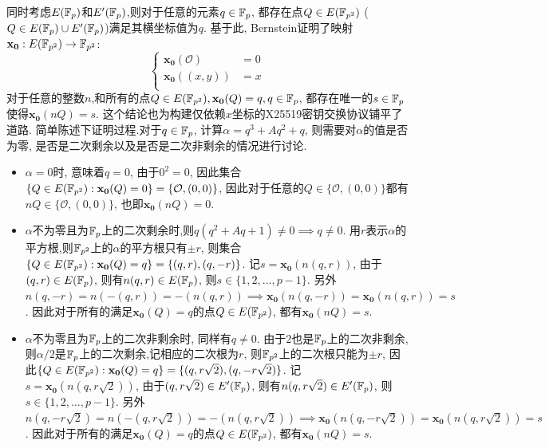 同时考虑$E(\mathbb{F}_p)$和$E'(\mathbb{F}_p)$,则对于任意的元素$q\in\mathbb{F}_p$,
都存在点$Q\in E(\mathbb{F}_{p^2})$ ($Q\in E(\mathbb{F}_p) \cup E'(\mathbb{F}_p)$)满足其横坐标值为$q$.
基于此, Bernstein证明了映射$\mathbf{x_0}: E(\mathbb{F}_{p^2}) \rightarrow \mathbb{F}_{p^2}$:
\begin{equation}\label{eq-mapx0}
\left\{
\begin{array}{rr}
 \mathbf{x_0}(\mathcal{O}) &  = 0 \\
\mathbf{x_0}((x,y)) & =  x \\
\end{array}
\right.
\end{equation}
对于任意的整数$n$,和所有的点$Q\in E(\mathbb{F}_{p^2}), \mathbf{x_0}(Q) = q, q \in \mathbb{F}_p$, 
都存在唯一的$s\in\mathbb{F}_p$使得$\mathbf{x_0}(nQ) = s$. 
这个结论也为构建仅依赖$x$坐标的X25519密钥交换协议铺平了道路.
简单陈述下证明过程.对于$q\in\mathbb{F}_p$, 计算$\alpha = q^3 + Aq^2 + q$,
则需要对$\alpha$的值是否为零, 是否是二次剩余以及是否是二次非剩余的情况进行讨论.
\begin{itemize}
\item 
$\alpha = 0$时, 意味着$q=0$, 由于$0^2 = 0$, 因此集合$\{ Q\in E(\mathbb{F}_{p^2}): \mathbf{x_0}(Q) = 0 \} 
= \{ \mathcal{O}, (0,0) \}$, 因此对于任意的$Q\in\{ \mathcal{O}, (0,0)\}$都有$nQ \in \{ \mathcal{O}, (0,0)\}$,
也即$\mathbf{x_0}(nQ) = 0$.
\item 
$\alpha$不为零且为$\mathbb{F}_p$上的二次剩余时,则$q(q^2 + Aq + 1) \neq 0 \implies q\neq 0$.
用$r$表示$\alpha$的平方根,则$\mathbb{F}_{p^2}$上的$\alpha$的平方根只有$\pm r$, 则集合
$\{ Q\in E(\mathbb{F}_{p^2}): \mathbf{x_0}(Q) = q \} = \{ (q,r), (q,-r) \}$.
记$s = \mathbf{x_0}(n(q,r))$, 由于$(q,r)\in E(\mathbb{F}_{p})$, 则有$n(q,r)\in E(\mathbb{F}_p)$, 则$s\in \{1,2,\ldots, p-1\}$.
另外$n(q,-r) = n(-(q,r)) = -(n(q,r)) \implies \mathbf{x_0}(n(q,-r)) = \mathbf{x_0}(n(q,r)) = s$.
因此对于所有的满足$\mathbf{x_0}(Q) = q$的点$Q\in E(\mathbb{F}_{p^2})$, 都有$\mathbf{x_0}(nQ) = s$.
\item
$\alpha$不为零且为$\mathbb{F}_p$上的二次非剩余时, 同样有$q\neq0$. 由于$2$也是$\mathbb{F}_p$上的二次非剩余,
则$\alpha/2$是$\mathbb{F}_p$上的二次剩余,记相应的二次根为$r$, 则$\mathbb{F}_{p^2}$上的二次根只能为$\pm r$,
因此$\{ Q\in E(\mathbb{F}_{p^2}): \mathbf{x_0}(Q) = q \} = \{ (q,r\sqrt{2}), (q,-r\sqrt{2}) \}$.
记$s = \mathbf{x_0}(n(q, r\sqrt{2}))$,
由于$(q,r\sqrt{2})\in E'(\mathbb{F}_{p})$, 则有$n(q,r\sqrt{2})\in E'(\mathbb{F}_p)$, 则$s\in \{1,2,\ldots, p-1\}$.
另外$n(q,-r\sqrt{2}) = n(-(q,r\sqrt{2})) = -(n(q,r\sqrt{2})) \implies 
\mathbf{x_0}(n(q,-r\sqrt{2})) = \mathbf{x_0}(n(q,r\sqrt{2})) = s$.
因此对于所有的满足$\mathbf{x_0}(Q) = q$的点$Q\in E(\mathbb{F}_{p^2})$, 都有$\mathbf{x_0}(nQ) = s$.
\end{itemize}

